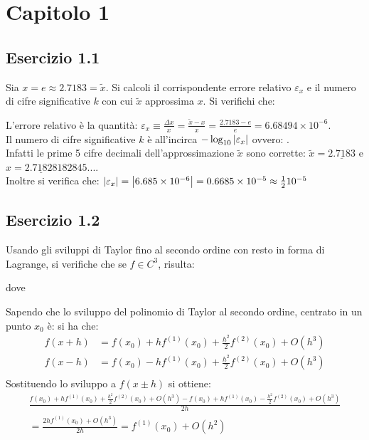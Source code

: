 \section{Capitolo 1}


	\subsection{Esercizio 1.1}

Sia $x = e \approx 2.7183 = \tilde{x}$. Si calcoli il corrispondente errore relativo $\varepsilon_x$ e il numero di cifre significative $k$ con cui $\tilde{x}$ approssima $x$. Si verifichi che:

\PP
L'errore relativo è la quantità: $\varepsilon_x \equiv \frac{\Delta{x}}{x}=\frac{\tilde{x}-x}{x} = \frac{2.7183-e}{e} = 6.68494 \times 10^{-6}$.\\
Il numero di cifre significative $k$ è all'incirca $-\log_{10}{\abs{\varepsilon_x}}$ ovvero: 
.\\
Infatti le prime 5 cifre decimali dell'approssimazione $\tilde{x}$ sono corrette: $\tilde{x}  =\underline{2.7183}$ e $x = \underline{2.71828}182845...$.\\
Inoltre si verifica che: $\abs{\varepsilon_x} = \abs{6.685 \times 10^{-6}} = 0.6685 \times 10^{-5} \approx \frac{1}{2}10^{-5}$


	\subsection{Esercizio 1.2}
	
	Usando gli sviluppi di Taylor fino al secondo ordine con resto in forma di Lagrange, si verifiche che se $f \in C^3$, risulta:
	

	dove

\PP
Sapendo che lo sviluppo del polinomio di Taylor al secondo ordine, centrato in un punto $x_0$ è:
si ha che:
\begin{equation*}
	\begin{split}
	f(x+h) & = f(x_0) + hf^{(1)}(x_0)+\frac{h^2}{2}f^{(2)}(x_0) + O(h^3) \\
	f(x-h) & = f(x_0) - hf^{(1)}(x_0)+\frac{h^2}{2}f^{(2)}(x_0) + O(h^3) \\	
	\end{split}
\end{equation*}
Sostituendo lo sviluppo a $f(x \pm h)$ si ottiene:
\begin{equation*}
	\begin{split}
\frac{f(x_0) + hf^{(1)}(x_0)+\frac{h^2}{2}f^{(2)}(x_0) + O(h^3) - f(x_0) + hf^{(1)}(x_0)-\frac{h^2}{2}f^{(2)}(x_0) + O(h^3)}{2h}\\ 
	= \frac{2hf^{(1)}(x_0) + O(h^3)}{2h} = f^{(1)}(x_0) + O(h^2)
	\end{split}
\end{equation*}


